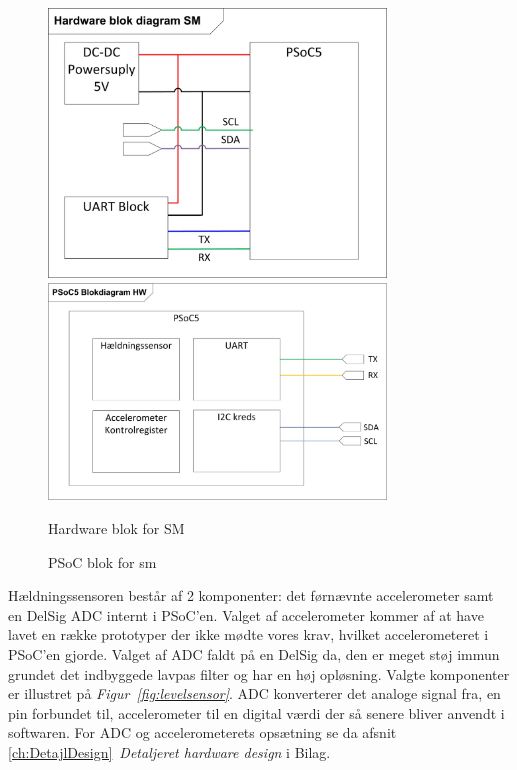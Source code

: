 \begin{figure}[H]
	\centering
	\begin{minipage}[b]{0.48\textwidth}\centering
	\includegraphics[width=0.80\textwidth]{billeder/SMHardware}
	\end{minipage}
	\begin{minipage}[b]{0.48\textwidth}\centering
	\includegraphics[width=0.80\textwidth]{billeder/SMPSoCblock}
	\end{minipage}
	\begin{minipage}[t]{0.48\textwidth}
	\caption{Hardware blok for SM}
	\label{fig:SMHW1}
	\end{minipage}
	\begin{minipage}[t]{0.48\textwidth}
	\caption{PSoC blok for sm}
	\label{fig:SMPSOC1}
	\end{minipage}
\end{figure}
Hældningssensoren består af 2 komponenter: det førnævnte accelerometer samt en DelSig ADC internt i PSoC'en. Valget af accelerometer kommer af at have lavet en række prototyper der ikke mødte vores krav, hvilket accelerometeret i PSoC'en gjorde. Valget af ADC faldt på en DelSig da, den er meget støj immun grundet det indbyggede lavpas filter og har en høj opløsning. Valgte komponenter er illustret på \textit{Figur~\ref{fig:levelsensor}}. ADC konverterer det analoge signal fra, en pin forbundet til, accelerometer til en digital værdi der så senere bliver anvendt i softwaren. For ADC og accelerometerets opsætning se da afsnit \ref{ch:DetajlDesign}~\textit{Detaljeret hardware design} i Bilag.
